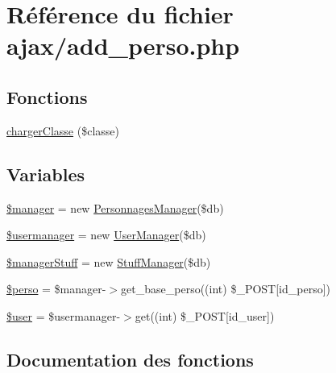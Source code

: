 \hypertarget{add__perso_8php}{}\section{Référence du fichier ajax/add\+\_\+perso.php}
\label{add__perso_8php}
\subsection*{Fonctions}
\begin{DoxyCompactItemize}
\item 
\mbox{\hyperlink{add__perso_8php_a6bdbbd60a21fa5e8c1db3f7596a47013}{charger\+Classe}} (\$classe)
\end{DoxyCompactItemize}
\subsection*{Variables}
\begin{DoxyCompactItemize}
\item 
\mbox{\hyperlink{add__perso_8php_a4621b1cd69b1417c9fb966c825299de1}{\$manager}} = new \mbox{\hyperlink{class_personnages_manager}{Personnages\+Manager}}(\$db)
\item 
\mbox{\hyperlink{add__perso_8php_a1844abd2b7670cc866b055ad9d342102}{\$usermanager}} = new \mbox{\hyperlink{class_user_manager}{User\+Manager}}(\$db)
\item 
\mbox{\hyperlink{add__perso_8php_ad4b5aa6a9d6e4cad8f747fef1cf199cb}{\$manager\+Stuff}} = new \mbox{\hyperlink{class_stuff_manager}{Stuff\+Manager}}(\$db)
\item 
\mbox{\hyperlink{add__perso_8php_a648bcc9981df7cceb4b931a80064a6c5}{\$perso}} = \$manager-\/$>$get\+\_\+base\+\_\+perso((int) \$\+\_\+\+P\+O\+ST\mbox{[}\textquotesingle{}id\+\_\+perso\textquotesingle{}\mbox{]})
\item 
\mbox{\hyperlink{add__perso_8php_a598ca4e71b15a1313ec95f0df1027ca5}{\$user}} = \$usermanager-\/$>$get((int) \$\+\_\+\+P\+O\+ST\mbox{[}\textquotesingle{}id\+\_\+user\textquotesingle{}\mbox{]})
\end{DoxyCompactItemize}


\subsection{Documentation des fonctions}
\mbox{\label{add__perso_8php_a6bdbbd60a21fa5e8c1db3f7596a47013}} 
